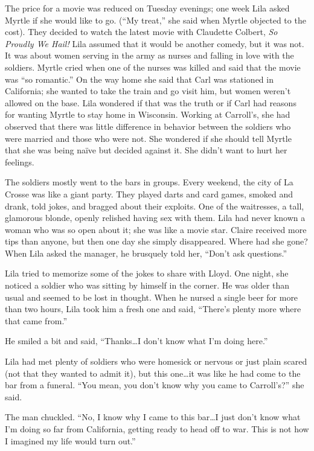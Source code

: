 \documentclass[
  letterpaper,
]{book}
\begin{document}
The price for a movie was reduced on Tuesday evenings; one week Lila
asked Myrtle if she would like to go. (``My treat,'' she said when
Myrtle objected to the cost). They decided to watch the latest movie
with Claudette Colbert, \emph{So Proudly We Hail!} Lila assumed that it
would be another comedy, but it was not. It was about women serving in
the army as nurses and falling in love with the soldiers. Myrtle cried
when one of the nurses was killed and said that the movie was ``so
romantic.'' On the way home she said that Carl was stationed in
California; she wanted to take the train and go visit him, but women
weren't allowed on the base. Lila wondered if that was the truth or if
Carl had reasons for wanting Myrtle to stay home in Wisconsin. Working
at Carroll's, she had observed that there was little difference in
behavior between the soldiers who were married and those who were not.
She wondered if she should tell Myrtle that she was being naïve but
decided against it. She didn't want to hurt her feelings.

The soldiers mostly went to the bars in groups. Every weekend, the city
of La Crosse was like a giant party. They played darts and card games,
smoked and drank, told jokes, and bragged about their exploits. One of
the waitresses, a tall, glamorous blonde, openly relished having sex
with them. Lila had never known a woman who was so open about it; she
was like a movie star. Claire received more tips than anyone, but then
one day she simply disappeared. Where had she gone? When Lila asked the
manager, he brusquely told her, ``Don't ask questions.''

Lila tried to memorize some of the jokes to share with Lloyd. One night,
she noticed a soldier who was sitting by himself in the corner. He was
older than usual and seemed to be lost in thought. When he nursed a
single beer for more than two hours, Lila took him a fresh one and said,
``There's plenty more where that came from.''

He smiled a bit and said, ``Thanks\ldots I don't know what I'm doing
here.''

Lila had met plenty of soldiers who were homesick or nervous or just
plain scared (not that they wanted to admit it), but this one\ldots it
was like he had come to the bar from a funeral. ``You mean, you don't
know why you came to Carroll's?'' she said.

The man chuckled. ``No, I know why I came to this bar\ldots I just don't
know what I'm doing so far from California, getting ready to head off to
war. This is not how I imagined my life would turn out.''
\end{document}
